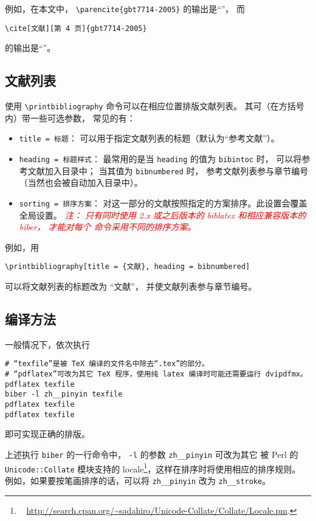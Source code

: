 \documentclass[UTF8]{ctexart}
\newcommand{\myemph}[1]{\emph{\textcolor{red}{#1}}}
\begin{document}
例如，在本文中，%
\verb|\parencite{gbt7714-2005}| 的输出是“\parencite{gbt7714-2005}”，
而
\begin{Verbatim}[frame = single]
\cite[文献][第 4 页]{gbt7714-2005}
\end{Verbatim}
的输出是“\cite[文献][第 4 页]{gbt7714-2005}”。

\subsection{文献列表}

使用 \verb|\printbibliography| 命令可以在相应位置排版文献列表。
其可（在方括号内）带一些可选参数\supercite{biblatex}，
常见的有：
\begin{itemize}
	\item \verb|title = 标题|：
		可以用于指定文献列表的标题（默认为“参考文献”）。
	\item \verb|heading = 标题样式|：
		最常用的是当 \verb|heading| 的值为 \verb|bibintoc| 时，
		可以将参考文献加入目录中；
		当其值为 \verb|bibnumbered| 时，
		参考文献列表参与章节编号（当然也会被自动加入目录中）。
	\item \verb|sorting = 排序方案|：
		对这一部分的文献按照指定的方案排序。此设置会覆盖全局设置。\myemph{%
			注：
			只有同时使用 2.x 或之后版本的 biblatex 和相应兼容版本的 biber，
			才能对每个 \texttt{\string\printbibliography} 命令采用不同的排序方案。%
		}
\end{itemize}

例如，用
\begin{Verbatim}[frame = single]
\printbibliography[title = {文献}, heading = bibnumbered]
\end{Verbatim}
可以将文献列表的标题改为 “文献”，
并使文献列表参与章节编号。

\subsection{编译方法}

一般情况下，依次执行
\begin{Verbatim}[frame = single]
# “texfile”是被 TeX 编译的文件名中除去“.tex”的部分。
# “pdflatex”可改为其它 TeX 程序，使用纯 latex 编译时可能还需要运行 dvipdfmx。
pdflatex texfile
biber -l zh__pinyin texfile
pdflatex texfile
pdflatex texfile
\end{Verbatim}
即可实现正确的排版。

上述执行 \verb|biber| 的一行命令中，%
\verb|-l| 的参数 \verb|zh__pinyin| 可改为其它
被 Perl 的 \verb|Unicode::Collate| 模块支持的 locale\footnote{\ %
	\url{http://search.cpan.org/~sadahiro/Unicode-Collate/Collate/Locale.pm}.%
}，这样在排序时将使用相应的排序规则。
例如，如果要按笔画排序的话，可以将 \verb|zh__pinyin| 改为 \verb|zh__stroke|。
\end{document}

